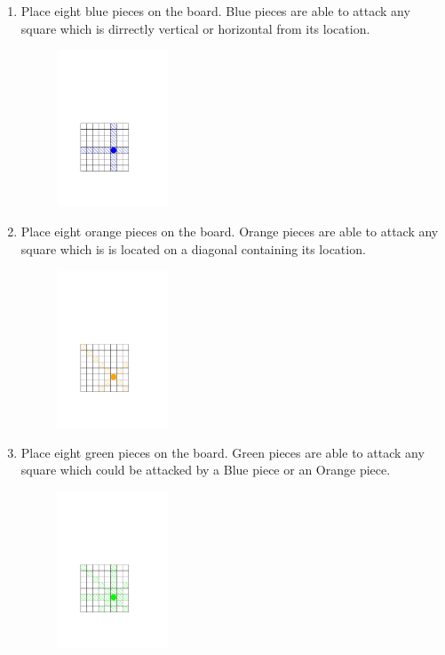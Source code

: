 
\newcommand{\activityname}{
  Chess Attack!
}


\begin{enumerate}
\item Place eight blue pieces on the board. Blue pieces are able to attack any square which is dirrectly vertical or horizontal from its location.
\begin{figure}[h]
\begin{center}
\includegraphics[width=1.3in]{RookAttack.pdf}
\end{center}
\end{figure}
\item Place eight orange pieces on the board. Orange pieces are able to attack any square which is is located on a diagonal containing its location.
\begin{figure}[h]
\begin{center}
\includegraphics[width=1.3in]{BishopAttack.pdf}
\end{center}
\end{figure}
\item Place eight green pieces on the board. Green pieces are able to attack any square which could be attacked by a Blue piece or an Orange piece.
\begin{figure}[h]
\begin{center}
\includegraphics[width=1.3in]{QueenAttack.pdf}
\end{center}
\end{figure}
\end{enumerate}

